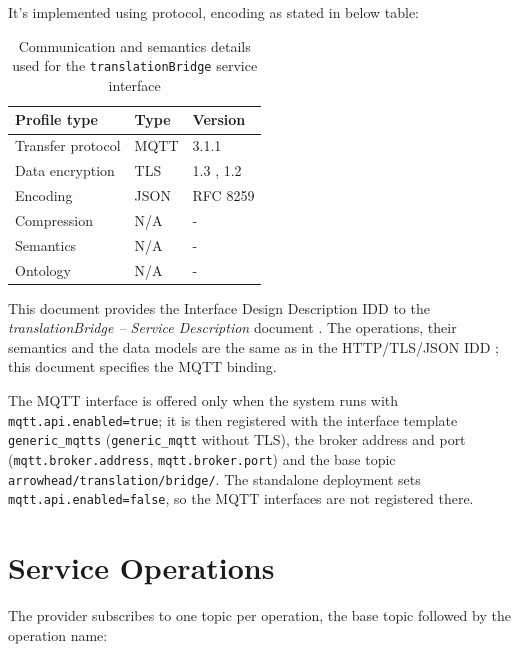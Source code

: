 \documentclass[a4paper]{arrowhead}
\begin{document}
It's implemented using protocol, encoding as stated in below table:
\begin{table}[ht!]
  \centering
  \begin{tabular}{|l|l|l|}
    \hline
    \rowcolor{gray!33} Profile type & Type & Version \\ \hline
    Transfer protocol & MQTT & 3.1.1 \cite{mqtt311} \\ \hline
    Data encryption & TLS & 1.3 \cite{rfc8446}, 1.2 \cite{rfc5246} \\ \hline
    Encoding & JSON & RFC 8259 \cite{rfc8259} \\ \hline
    Compression & N/A & - \\ \hline
    Semantics & N/A & - \\ \hline
    Ontology & N/A & - \\ \hline
  \end{tabular}
  \caption{Communication and semantics details used for the \texttt{translationBridge} service interface}
  \label{tab:comunication_semantics_profile}
\end{table}

This document provides the Interface Design Description IDD to the \textit{translationBridge -- Service Description} document \cite{tm-translationBridge-sd}.
The operations, their semantics and the data models are the same as in the HTTP/TLS/JSON IDD \cite{tm-translationBridge-http-idd}; this document specifies the MQTT binding.

The MQTT interface is offered only when the system runs with \texttt{mqtt.api.enabled=true}; it is then registered with the interface template \texttt{generic\_\allowbreak{}mqtts} (\texttt{generic\_\allowbreak{}mqtt} without TLS), the broker address and port (\texttt{mqtt.\allowbreak{}broker.\allowbreak{}address}, \texttt{mqtt.\allowbreak{}broker.\allowbreak{}port}) and the base topic \texttt{arrowhead/\allowbreak{}translation/\allowbreak{}bridge/\allowbreak{}}. The standalone deployment sets \texttt{mqtt.\allowbreak{}api.\allowbreak{}enabled=\allowbreak{}false}, so the MQTT interfaces are not registered there.

\newpage

\section{Service Operations}
\label{sec:operations}

The provider subscribes to one topic per operation, the base topic followed by the operation name:
\end{document}
